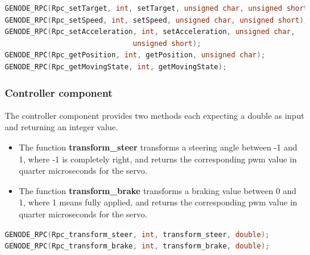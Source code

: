 \begin{lstlisting}[language=c, frame=single, basicstyle=\footnotesize, caption=Genode interface for servo component]
GENODE_RPC(Rpc_setTarget, int, setTarget, unsigned char, unsigned short);
GENODE_RPC(Rpc_setSpeed, int, setSpeed, unsigned char, unsigned short);
GENODE_RPC(Rpc_setAcceleration, int, setAcceleration, unsigned char, 
						      unsigned short);
GENODE_RPC(Rpc_getPosition, int, getPosition, unsigned char);
GENODE_RPC(Rpc_getMovingState, int, getMovingState);
\end{lstlisting}

\subsubsection{Controller component}
\label{sec:comp-controller}

The controller component provides two methods each expecting a double as input and returning an integer value.
\begin{itemize}
\item The function \textbf{transform\_steer} transforms a steering angle between -1 and 1, where -1 is completely right, and returns the corresponding pwm value in quarter microseconds for the servo.
\item The function \textbf{transform\_brake} transforms a braking value between 0 and 1, where 1 means fully applied, and returns the corresponding pwm value in quarter microseconds for the servo.
\end{itemize}

\begin{lstlisting}[language=c, frame=single, basicstyle=\footnotesize, caption=Genode interface for controller component]
GENODE_RPC(Rpc_transform_steer, int, transform_steer, double);
GENODE_RPC(Rpc_transform_brake, int, transform_brake, double);
\end{lstlisting}